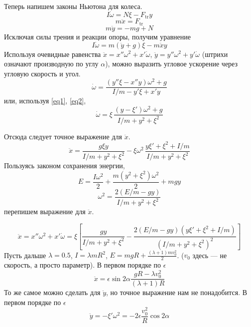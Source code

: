 \documentclass{article}
\begin{document}
	Теперь напишем законы Ньютона для колеса.
	\begin{equation}
		I\dot{\omega} = N\xi - F_{\mathrm{tr}}y
	\end{equation}
	\begin{equation}
		m\ddot{x} = F_{\mathrm{tr}}
	\end{equation}
	\begin{equation}
		m\ddot{y} = -mg + N
	\end{equation}
	Исключая силы трения и реакции опоры, получим уравнение
	\begin{equation}
		I\dot{\omega} = m(\ddot{y} + g)\xi - m\ddot{x}y
	\end{equation}
	Используя очевидные равенства $\ddot{x} = x''\omega^2 + x'\dot{\omega}$, 
	$\ddot{y} = y''\omega^2 + y'\dot{\omega}$ (штрихи означают
	производную по углу $\alpha$), можно выразить угловое ускорение через
	угловую скорость и угол.
	\begin{equation}	
		\label{ddotomega}
		\dot{\omega} = \frac{(y''\xi - x''y)\omega^2 + g  }{ I/m - y'\xi + x'y }
	\end{equation}
	или, используя \ref{eq1}, \ref{eq2},
	\begin{equation}
		\dot{\omega} = \xi\,\frac{(y - \xi')\omega^2 + g}{I/m + y^2 + \xi^2}
	\end{equation}
	
	Отсюда следует точное выражение для $\ddot{x}$.
	\begin{equation}
		\ddot{x} = \frac{g\xi y}{I/m + y^2 + \xi^2} - \xi \omega^2
						\, \frac{y\xi' + \xi^2 + I/m}{I/m + y^2 + \xi^2}
	\end{equation}
	Пользуясь законом сохранения энергии,
	\begin{equation}
		E = \frac{I\omega^2}{2} + \frac{m(y^2 + \xi^2)\omega^2}{2} + mgy
	\end{equation}
	\begin{equation}
		\omega^2 = \frac{2(E/m - gy)}{I/m + y^2 + \xi^2}
	\end{equation}
	перепишем выражение для $\ddot{x}$.
	
	\begin{equation}
		\label{ddotx}
		\ddot{x} = x''\omega^2 + x'\dot{\omega} =  \xi\left [\frac{gy}{I/m + y^2 + \xi^2} 
						- \frac{2(E/m - gy)(y\xi' + \xi^2 + I/m)}
									{(I/m + y^2 + \xi^2)^2} \right ]
	\end{equation}
	Пусть дальше $\lambda = 0.5$, $I = \lambda mR^2$, 
	$E = mgR + \frac{(\lambda+1)mv_0^2}{2}$. ($v_0$ здесь --- не 
	скорость, а просто параметр).
	В первом порядке по $\epsilon$
	\begin{equation}
		\ddot{x} = \epsilon\sin{2\alpha}\frac{gR - \lambda v_0^2}{(\lambda + 1)R}
	\end{equation}
	То же самое можно сделать для $\ddot{y}$, но точное выражение нам не понадобится. В первом 
	порядке по $\epsilon$ 
	\begin{equation}
		\ddot{y} = -\xi'\omega^2 = -2\epsilon\frac{v_0^2}{R}\cos{2\alpha}
	\end{equation}
	
\end{document}
